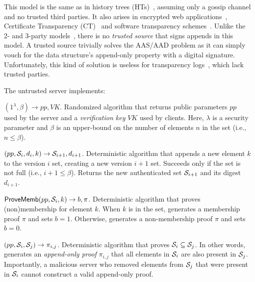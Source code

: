 This model is the same as in history trees (HTs)~\cite{ht}, assuming only a gossip channel and no trusted third parties.
It also arises in encrypted web applications~\cite{mylar,verena,frientegrity}, Certificate Transparency (CT)~\cite{ct} and software transparency schemes~\cite{at,chainiac}.
Unlike the 2- and 3-party models~\cite{two-party-ad,pads,balloon}, there is no \textit{trusted source} that signs appends in this model.
A trusted source trivially solves the AAS/AAD problem as it can simply vouch for the data structure's append-only property with a digital signature.
Unfortunately, this kind of solution is useless for transparency logs~\cite{ct,ect,coniks}, which lack trusted parties.


The untrusted server implements:
\vspace{.5em}

\api {\setup}$(1^\lambda, \beta) \rightarrow pp, VK$.
Randomized algorithm that returns public parameters $pp$ used by the server and a \textit{verification key} $VK$ used by clients.
Here, $\lambda$ is a security parameter and $\beta$ is an upper-bound on the number of elements $n$ in the set (i.e., $n \le \beta$).

\api {\append}$(pp, \mathcal{S}_i, d_i, k) \rightarrow \mathcal{S}_{i+1}, d_{i+1}$.
Deterministic algorithm that appends a new element $k$ to the version $i$ set, creating a new version $i+1$ set.
Succeeds only if the set is not full (i.e., $i + 1 \le \beta$).
Returns the new authenticated set $\mathcal{S}_{i+1}$ and its digest $d_{i+1}$.

\api $\mathsf{ProveMemb}(pp, \mathcal{S}_i, k) \rightarrow b, \pi$.
Deterministic algorithm that proves (non)membership for element $k$.
When $k$ is in the set, generates a membership proof $\pi$ and sets $b=1$.
Otherwise, generates a non-membership proof $\pi$ and sets $b=0$.

\api {\proveappendonly}$(pp, \mathcal{S}_i, \mathcal{S}_j) \rightarrow \pi_{i, j}$.
Deterministic algorithm that proves $\mathcal{S}_i \subseteq \mathcal{S}_j$.
In other words, generates an \textit{append-only proof} $\pi_{i, j}$ that all elements in $\mathcal{S}_i$ are also present in $\mathcal{S}_j$.
Importantly, a malicious server who removed elements from $\mathcal{S}_j$ that were present in $\mathcal{S}_i$ cannot construct a valid append-only proof.

